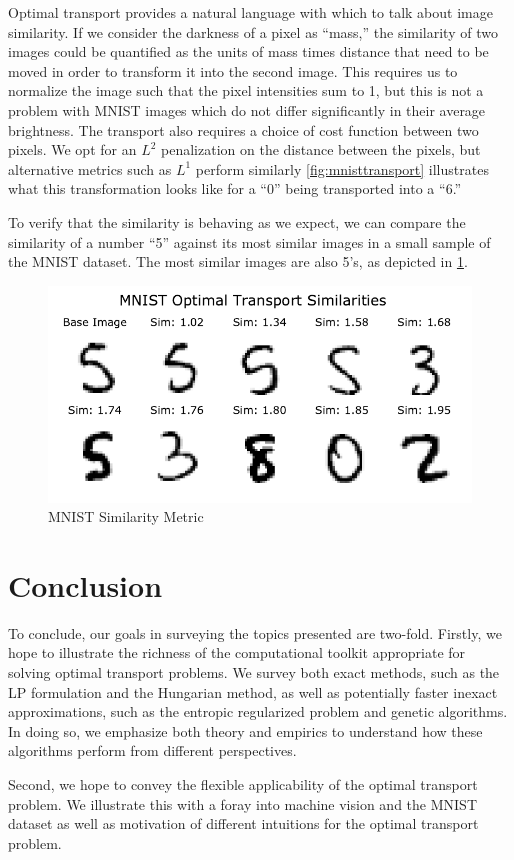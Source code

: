 \documentclass{article}
\theoremstyle{definition}
\theoremstyle{remark}
\begin{document}
Optimal transport provides a natural language with which to talk about image
similarity. If we consider the darkness of a pixel as ``mass,''  the similarity
of two images could be quantified as the units of mass times distance that need
to be moved in order to transform it into the second image. This requires us to
normalize the image such that the pixel intensities sum to 1, but this is not a
problem with MNIST images which do not differ significantly in their average
brightness. The transport also requires a choice of cost function between two
pixels. We opt for an $L^2$ penalization on the distance between the pixels, but
alternative metrics such as $L^1$ perform similarly \cref{fig:mnisttransport}
illustrates what this transformation looks like for a ``0'' being transported
into a ``6.'' 

To verify that the similarity is behaving as we expect, we can compare the
similarity of a number ``5'' against its most similar images in a small sample
of the MNIST dataset. The most similar images are also 5's, as depicted in
\cref{fig:mnistsim}.


\begin{figure}[tb]
  \centering
  \includegraphics{../../code/mnist-similarity.pdf}
  \caption{MNIST Similarity Metric}
  \label{fig:mnistsim}
\end{figure}




\section{Conclusion} %
\label{sec:conclusion}

To conclude, our goals in surveying the topics presented are two-fold. Firstly,
we hope to illustrate the richness of the computational toolkit appropriate for
solving optimal transport problems. We survey both exact methods, such as the LP
formulation and the Hungarian method, as well as potentially faster inexact
approximations, such as the entropic regularized problem and genetic algorithms.
In doing so, we emphasize both theory and empirics to understand how these
algorithms perform from different perspectives.

Second, we hope to convey the flexible applicability of the optimal transport
problem. We illustrate this with a foray into machine vision and the MNIST
dataset as well as motivation of different intuitions for the optimal transport
problem.




\end{document}
